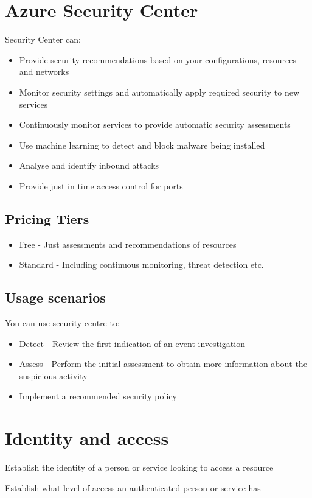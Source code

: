 \documentclass{article}[18pt]
\begin{document}
\section{Azure Security Center}
Security Center can:
\begin{itemize}
	\item Provide security recommendations based on your configurations, resources and networks
	\item Monitor security settings and automatically apply required security to new services
	\item Continuously monitor services to provide automatic security assessments
	\item Use machine learning to detect and block malware being installed
	\item Analyse and identify inbound attacks
	\item Provide just in time access control for ports
\end{itemize}
\subsection{Pricing Tiers}
\begin{itemize}
	\item Free - Just assessments and recommendations of resources
	\item Standard - Including continuous monitoring, threat detection etc.
\end{itemize}
\subsection{Usage scenarios}
You can use security centre to:
\begin{itemize}
	\item Detect - Review the first indication of an event investigation
	\item Assess - Perform the initial assessment to obtain more information about the suspicious activity
	\item Implement a recommended security policy
\end{itemize}

\section{Identity and access}
\begin{definition}[Authentication]
	Establish the identity of a person or service looking to access a resource
\end{definition}
\begin{definition}[Authorization]
	Establish what level of access an authenticated person or service has
\end{definition}
\end{document}
